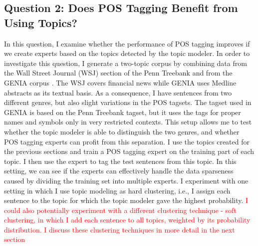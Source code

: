 
\subsection*{Question 2: Does POS Tagging Benefit from Using Topics?}

In this question, I examine whether the performance of POS tagging improves if we create experts based on the topics detected by the topic modeler. 
In order to investigate this question, I generate a two-topic corpus by combining data from the Wall Street Journal (WSJ) section of the Penn Treebank \cite{marcus:kim:ea:94} and from the GENIA corpus \cite{tateisi:tsujii:04}. The WSJ covers financial news while GENIA uses Medline abstracts as its textual basis. As a consequence, I have sentences from two different genres, but also slight variations in the POS tagsets. The tagset used in GENIA is based on the Penn Treebank tagset, but it uses the tags for proper names and symbols only in very restricted contexts. This setup allows me to test whether the topic modeler is able to distinguish the two genres, and whether POS tagging experts can profit from this separation. I use the topics created for the previous sections and train a POS tagging expert on the training part of each topic. I then use the expert to tag the test sentences from this topic. In this setting, we can see  if the experts can effectively handle the data sparseness caused by dividing the training set into multiple experts. I experiment with one setting in which I use topic modeling as hard clustering, i.e., I assign each sentence to the topic for which the topic modeler gave the highest probability. \textcolor{red}{I could also potentially experiment with a different clustering technique - soft clustering, in which I add  each sentence to all topics, weighted by its probability distribution. I discuss these clustering techniques in more detail in the next section}

